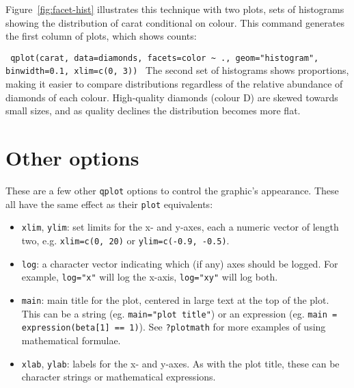 
Figure~\ref{fig:facet-hist} illustrates this technique with two plots, sets of histograms showing the distribution of carat conditional on colour. This command generates the first column of plots, which shows counts:

{\tt
 qplot(carat, data=diamonds, facets=color \verb|~| ., geom="histogram", binwidth=0.1, xlim=c(0, 3))
}
%
The second set of histograms shows proportions, making it easier to compare distributions regardless of the relative abundance of diamonds of each colour. High-quality diamonds (colour D) are skewed towards small sizes, and as quality declines the distribution becomes more flat.  


% 


\section{Other options}\label{sec:other_options}

These are a few other {\tt qplot} options to control the graphic's appearance. These all have the same effect as their {\tt plot} equivalents:

\begin{itemize}
  \item {\tt xlim}, {\tt ylim}: set limits for the x- and y-axes, each a numeric vector of length two, e.g. {\tt xlim=c(0, 20)} or {\tt ylim=c(-0.9, -0.5)}.
  \item {\tt log}: a character vector indicating which (if any) axes should be logged.  For example, {\tt log="x"} will log the x-axis, {\tt log="xy"} will log both.
  \item {\tt main}: main title for the plot, centered in large text at the top of the plot.  This can be a string (eg. {\tt main="plot title"}) or an expression (eg. {\tt main = expression(beta[1] == 1)}).  See {\tt ?plotmath} for more examples of using mathematical formulae.
  \item {\tt xlab}, {\tt ylab}: labels for the x- and y-axes.  As with the plot title, these can be character strings or mathematical expressions.
\end{itemize}

